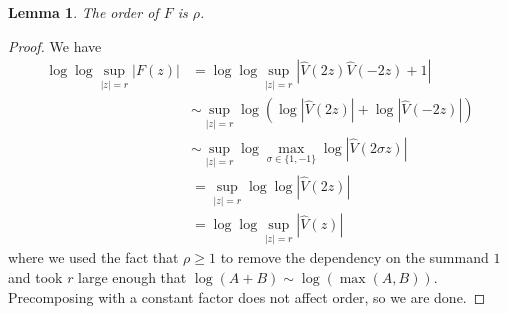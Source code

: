 \documentclass[12pt]{report}
\newtheorem{lemma}[theorem]{Lemma}
\theoremstyle{definition}
\begin{document}
\begin{lemma}
\label{order of F}
The order of $F$ is $\rho$.
\end{lemma}
\begin{proof}
We have
\begin{align*}\log \log \sup_{|z| = r} |F(z)| &= \log \log \sup_{|z| = r} |\hat V(2z)\hat V(-2z) + 1| \\
  &\sim \sup_{|z| = r} \log(\log |\hat V(2z)| + \log |\hat V(-2z)|)\\
  &\sim \sup_{|z| = r} \log \max_{\sigma \in \{1,-1\}} \log |\hat V(2\sigma z)|\\
  &= \sup_{|z| = r} \log \log |\hat V(2z)|\\
  &= \log \log \sup_{|z| = r} |\hat V(z)|
\end{align*}
where we used the fact that $\rho \geq 1$ to remove the dependency on the summand $1$ and took $r$ large enough that $\log(A + B) \sim \log(\max(A, B))$. Precomposing with a constant factor does not affect order, so we are done.
\end{proof}
\end{document}
